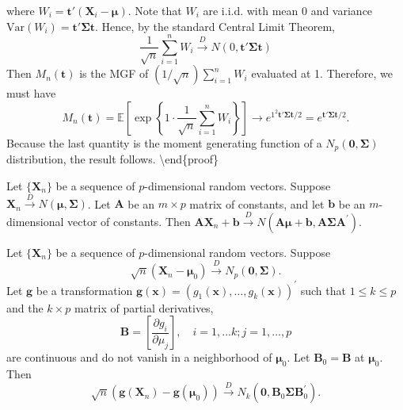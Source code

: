 where $W_i=\mathbf{t}'(\mathbf{X}_i-\boldsymbol{\mu})$. Note that $W_i$ are i.i.d. with mean 0 and variance $\mathrm{Var}(W_i)=\mathbf{t}'\boldsymbol{\Sigma}\mathbf{t}$. Hence, by the standard Central Limit Theorem,
\[
\frac{1}{\sqrt{ n }}\sum_{i=1}^{n} W_i\overset{ D }{ \to }N(0,\mathbf{t}'\boldsymbol{\Sigma}\mathbf{t})
\]
Then $M_n(\mathbf{t})$ is the MGF of $(1/\sqrt{ n })\sum_{i=1}^{n}W_i$ evaluated at 1. Therefore, we must have
\[
M_n(\mathbf{t})=\mathbb{E}\left[ \exp \left\{  1\cdot \frac{1}{\sqrt{ n }} \sum_{i=1}^{n} W_i  \right\} \right]\to e^{ 1^{2}\mathbf{t}'\boldsymbol{\Sigma}\mathbf{t}/2 }=e^{ \mathbf{t}'\boldsymbol{\Sigma}\mathbf{t}/2 }.
\]
Because the last quantity is the moment generating function of a $N_{p}(\mathbf{0},\boldsymbol{\Sigma})$ distribution, the result follows.
\textbackslash{}end\{proof\}

\begin{theorem}[Theorem 5.4.5]
Let $\{\mathbf{X}_n\}$ be a sequence of $p$-dimensional random vectors. Suppose $\mathbf{X}_n \xrightarrow{D} N(\boldsymbol{\mu}, \boldsymbol{\Sigma})$. Let $\mathbf{A}$ be an $m \times p$ matrix of constants, and let $\mathbf{b}$ be an $m$-dimensional vector of constants. Then $\mathbf{A} \mathbf{X}_n+\mathbf{b} \xrightarrow{D} N\left(\mathbf{A} \boldsymbol{\mu}+\mathbf{b}, \mathbf{A} \boldsymbol{\Sigma} \mathbf{A}^{\prime}\right)$.
\end{theorem}
\begin{theorem}[Theorem 5.4.6]
Let $\{\mathbf{X}_n\}$ be a sequence of $p$-dimensional random vectors. Suppose
\[
\sqrt{n}\left(\mathbf{X}_n-\boldsymbol{\mu}_0\right) \xrightarrow{D} N_p(\mathbf{0}, \boldsymbol{\Sigma}) .
\]Let $\mathbf{g}$ be a transformation $\mathbf{g}(\mathbf{x})=\left(g_1(\mathbf{x}), \ldots, g_k(\mathbf{x})\right)^{\prime}$ such that $1 \leq k \leq p$ and the $k \times p$ matrix of partial derivatives,
\[
\mathbf{B}=\left[\frac{\partial g_i}{\partial \mu_j}\right], \quad i=1, \ldots k ; j=1, \ldots, p
\]are continuous and do not vanish in a neighborhood of $\boldsymbol{\mu}_0$. Let $\mathbf{B}_0=\mathbf{B}$ at $\boldsymbol{\mu}_0$. Then
\[
\sqrt{n}\left(\mathbf{g}\left(\mathbf{X}_n\right)-\mathbf{g}\left(\boldsymbol{\mu}_0\right)\right) \xrightarrow{D} N_k\left(\mathbf{0}, \mathbf{B}_0 \boldsymbol{\Sigma} \mathbf{B}_0^{\prime}\right) .
\]
\end{theorem}